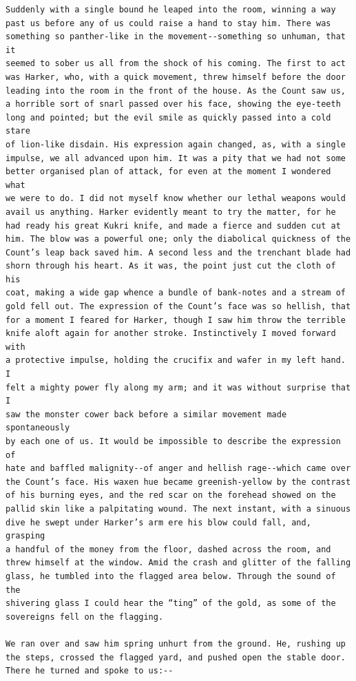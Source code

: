 \documentclass{article}
\begin{document}
\begin{verbatim}
Suddenly with a single bound he leaped into the room, winning a way
past us before any of us could raise a hand to stay him. There was
something so panther-like in the movement--something so unhuman, that it
seemed to sober us all from the shock of his coming. The first to act
was Harker, who, with a quick movement, threw himself before the door
leading into the room in the front of the house. As the Count saw us,
a horrible sort of snarl passed over his face, showing the eye-teeth
long and pointed; but the evil smile as quickly passed into a cold stare
of lion-like disdain. His expression again changed, as, with a single
impulse, we all advanced upon him. It was a pity that we had not some
better organised plan of attack, for even at the moment I wondered what
we were to do. I did not myself know whether our lethal weapons would
avail us anything. Harker evidently meant to try the matter, for he
had ready his great Kukri knife, and made a fierce and sudden cut at
him. The blow was a powerful one; only the diabolical quickness of the
Count’s leap back saved him. A second less and the trenchant blade had
shorn through his heart. As it was, the point just cut the cloth of his
coat, making a wide gap whence a bundle of bank-notes and a stream of
gold fell out. The expression of the Count’s face was so hellish, that
for a moment I feared for Harker, though I saw him throw the terrible
knife aloft again for another stroke. Instinctively I moved forward with
a protective impulse, holding the crucifix and wafer in my left hand. I
felt a mighty power fly along my arm; and it was without surprise that I
saw the monster cower back before a similar movement made spontaneously
by each one of us. It would be impossible to describe the expression of
hate and baffled malignity--of anger and hellish rage--which came over
the Count’s face. His waxen hue became greenish-yellow by the contrast
of his burning eyes, and the red scar on the forehead showed on the
pallid skin like a palpitating wound. The next instant, with a sinuous
dive he swept under Harker’s arm ere his blow could fall, and, grasping
a handful of the money from the floor, dashed across the room, and
threw himself at the window. Amid the crash and glitter of the falling
glass, he tumbled into the flagged area below. Through the sound of the
shivering glass I could hear the “ting” of the gold, as some of the
sovereigns fell on the flagging.

We ran over and saw him spring unhurt from the ground. He, rushing up
the steps, crossed the flagged yard, and pushed open the stable door.
There he turned and spoke to us:--


\end{verbatim}
\end{document}

